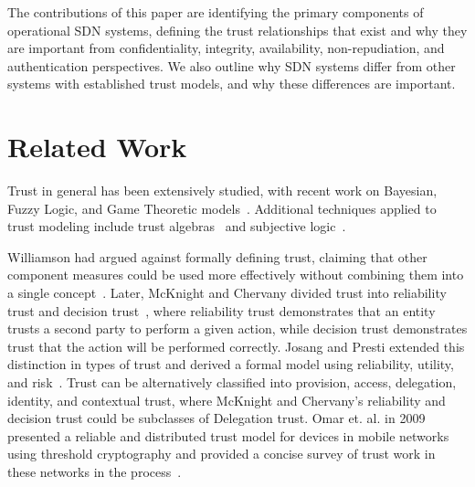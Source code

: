 \documentclass[10pt,conference]{IEEEtran}
\begin{document}
The contributions of this paper are identifying the primary components of operational SDN systems, defining the trust relationships that exist and why they are important from confidentiality, integrity, availability, non-repudiation, and authentication perspectives.  We also outline why SDN systems differ from other systems with established trust models, and why these differences are important.

\section{Related Work}
Trust in general has been extensively studied, with recent work on Bayesian, Fuzzy Logic, and Game Theoretic models~\cite{ChSwCh:11,JoIsBo:07,SaSi:05,ShNePa:13,GoMo:12}.  Additional techniques applied to trust modeling include trust algebras~\cite{WeCuBo:09,Jo:99} and subjective logic~\cite{JoHaPo:06,subjective_logic}.

Williamson had argued against formally defining trust, claiming that other component measures could be used more effectively without combining them into a single concept~\cite{Wi:93}.  Later, McKnight and Chervany divided trust into reliability trust and decision trust~\cite{McCh:96}, where reliability trust demonstrates that an entity trusts a second party to perform a given action, while decision trust demonstrates trust that the action will be performed correctly.  Josang and Presti extended this distinction in types of trust and derived a formal model using reliability, utility, and risk~\cite{JoPr:04}.  Trust can be alternatively classified into provision, access, delegation, identity, and contextual trust, where McKnight and Chervany's reliability and decision trust could be subclasses of Delegation trust.  Omar et. al. in 2009 presented a reliable and distributed trust model for devices in mobile networks using threshold cryptography and provided a concise survey of trust work in these networks in the process~\cite{OmChBo:09}.
\end{document}

